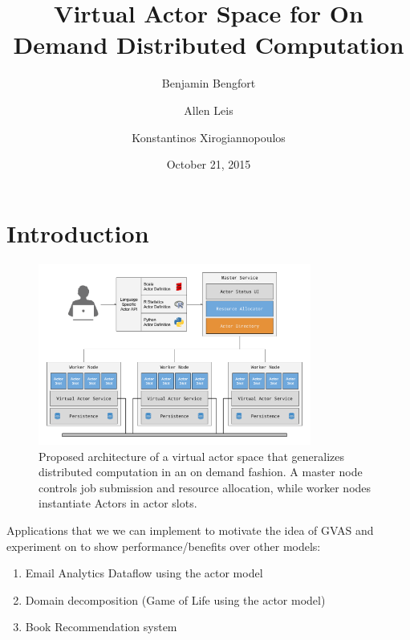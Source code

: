 \documentclass[11pt,letterpaper]{article}
\begin{document}
\title{Virtual Actor Space for On Demand Distributed Computation}
\author[1]{Benjamin Bengfort}
\author[2]{Allen Leis}
\author[1]{Konstantinos Xirogiannopoulos}

\date{October 21, 2015}

\maketitle
\section*{Introduction}

\begin{figure}[h]
	\centering
    \includegraphics[width=0.8\textwidth]{figures/architecture.png}
    \caption{\textsf{Proposed architecture of a virtual actor space that generalizes distributed computation in an on demand fashion. A master node controls job submission and resource allocation, while worker nodes instantiate Actors in actor slots.}}
    \label{fig:performance}
\end{figure}

Applications that we we can implement to motivate the idea of GVAS and experiment on to show performance/benefits over other models:

\begin{enumerate}
	\item Email Analytics Dataflow using the actor model
	\item Domain decomposition (Game of Life using the actor model)
	\item Book Recommendation system
\end{enumerate}



\end{document}
